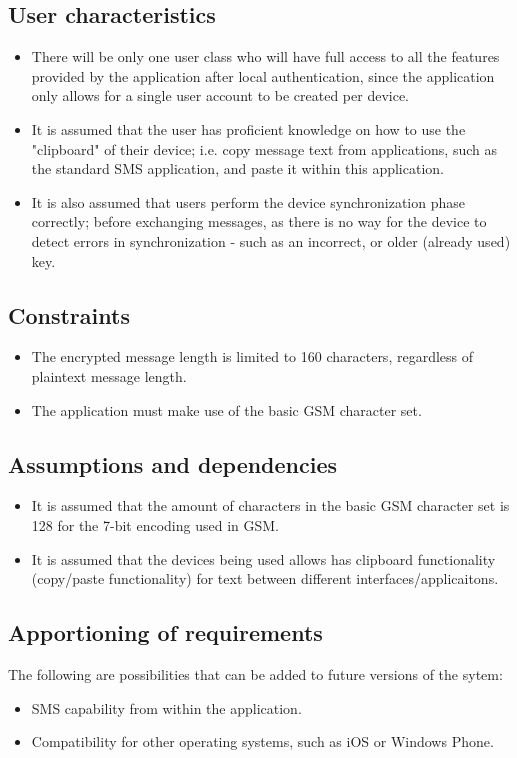 \subsection{User characteristics}
\begin{itemize}
\item There will be only one user class who will have full access to all the features provided by the application after local authentication, since the application only allows for a single user account to be created per device.
\item It is assumed that the user has proficient knowledge on how to use the "clipboard" of their device; i.e. copy message text from applications, such as the standard SMS application, and paste it within this application.
\item It is also assumed that users perform the device synchronization phase correctly; before exchanging messages, as there is no way for the device to detect errors in synchronization - such as an incorrect, or older (already used) key.
\end{itemize}

\subsection{Constraints}
\begin{itemize}
\item The encrypted message length is limited to 160 characters, regardless of plaintext message length.
\item The application must make use of the basic GSM character set.
\end{itemize}

\subsection{Assumptions and dependencies}

\begin{itemize}
\item It is assumed that the amount of characters in the basic GSM character set is 128 for the 7-bit encoding used in GSM.
\item It is assumed that the devices being used allows has clipboard functionality (copy/paste functionality) for text between different interfaces/applicaitons.
\end{itemize}

\subsection{Apportioning of requirements}
The following are possibilities that can be added to future versions of the sytem:
\begin{itemize}
\item SMS capability from within the application.
\item Compatibility for other operating systems, such as iOS or Windows Phone.
\end{itemize}